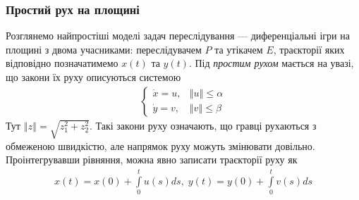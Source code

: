 \documentclass[10pt,pdf]{beamer}
\renewcommand{\d}[1]{\dot{#1}}
\newcommand{\norm}[1]{\left\Vert #1 \right\Vert}
\newcommand{\intl}{\int\limits}
\begin{document}
    \begin{frame}
        \frametitle{Простий рух на площині}
    
        Розглянемо найпростіші моделі задач переслідування --- диференціальні ігри на площині з двома учасниками:
        переслідувачем $P$ та утікачем $E$, траєкторії яких відповідно позначатимемо $x(t)$ та $y(t)$.
        Під \emph{простим рухом} мається на увазі, що закони їх руху описуються системою
        \begin{gather*}
            \begin{cases}
                \d{x} = u, & \norm{u} \leq \alpha \\
                \d{y} = v, & \norm{v} \leq \beta 
            \end{cases}
        \end{gather*}
        Тут $\norm{z} = \sqrt{z_1^2 + z_2^2}$.
        Такі закони руху означають, що гравці рухаються з обмеженою швидкістю,
        але напрямок руху можуть змінювати довільно. Проінтегрувавши рівняння, можна явно записати траєкторії руху як
        \begin{gather*}
            x(t) = x(0) + \intl_0^t u(s) ds, \;
            y(t) = y(0) + \intl_0^t v(s) ds
        \end{gather*}
    \end{frame}
\end{document}
